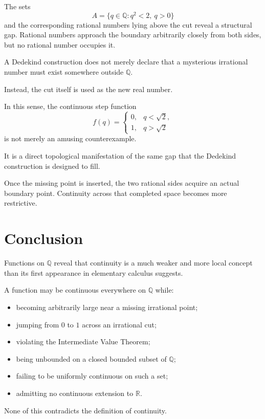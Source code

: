 \documentclass{essay}
\begin{document}
The sets
\[ A=\{q\in\mathbb{Q}:q^{2}<2,\ q>0\} \]
and the corresponding rational numbers lying above the cut reveal a structural
gap. Rational numbers approach the boundary arbitrarily closely from both
sides, but no rational number occupies it.

A Dedekind construction does not merely declare that a mysterious irrational
number must exist somewhere outside \(\mathbb{Q}\).

Instead, the cut itself is used as the new real number.

In this sense, the continuous step function
\[
  f(q)=
  \begin{cases}
    0,&q<\sqrt{2},\\
    1,&q>\sqrt{2}
  \end{cases}
\]
is not merely an amusing counterexample.

It is a direct topological manifestation of the same gap that the Dedekind
construction is designed to fill.

Once the missing point is inserted, the two rational sides acquire an actual
boundary point. Continuity across that completed space becomes more
restrictive.

\section{Conclusion}

Functions on \(\mathbb{Q}\) reveal that continuity is a much weaker and more
local concept than its first appearance in elementary calculus suggests.

A function may be continuous everywhere on \(\mathbb{Q}\) while:

\begin{itemize}
  \item becoming arbitrarily large near a missing irrational point;
  \item jumping from \(0\) to \(1\) across an irrational cut;
  \item violating the Intermediate Value Theorem;
  \item being unbounded on a closed bounded subset of \(\mathbb{Q}\);
  \item failing to be uniformly continuous on such a set;
  \item admitting no continuous extension to \(\mathbb{R}\).
\end{itemize}

None of this contradicts the definition of continuity.
\end{document}
